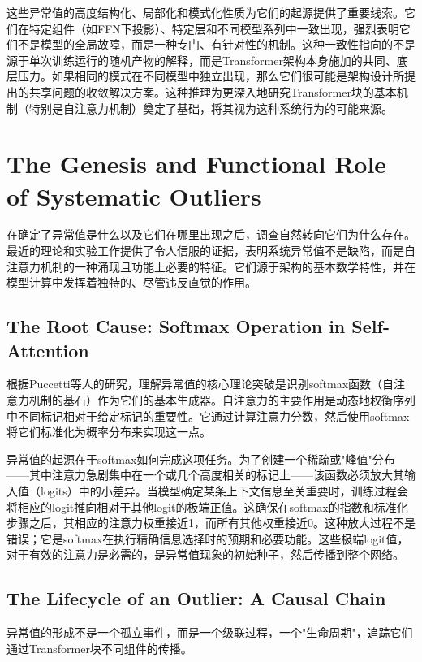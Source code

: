 \documentclass{article}
\begin{document}
这些异常值的高度结构化、局部化和模式化性质为它们的起源提供了重要线索。它们在特定组件（如FFN下投影）、特定层和不同模型系列中一致出现，强烈表明它们不是模型的全局故障，而是一种专门、有针对性的机制。这种一致性指向的不是源于单次训练运行的随机产物的解释，而是Transformer架构本身施加的共同、底层压力。如果相同的模式在不同模型中独立出现，那么它们很可能是架构设计所提出的共享问题的收敛解决方案。这种推理为更深入地研究Transformer块的基本机制（特别是自注意力机制）奠定了基础，将其视为这种系统行为的可能来源。

\section{The Genesis and Functional Role of Systematic Outliers}

在确定了异常值是什么以及它们在哪里出现之后，调查自然转向它们为什么存在。最近的理论和实验工作提供了令人信服的证据，表明系统异常值不是缺陷，而是自注意力机制的一种涌现且功能上必要的特征。它们源于架构的基本数学特性，并在模型计算中发挥着独特的、尽管违反直觉的作用。

\subsection{The Root Cause: Softmax Operation in Self-Attention}

根据Puccetti等人\cite{pucetti2021}的研究，理解异常值的核心理论突破是识别softmax函数（自注意力机制的基石）作为它们的基本生成器。自注意力的主要作用是动态地权衡序列中不同标记相对于给定标记的重要性。它通过计算注意力分数，然后使用softmax将它们标准化为概率分布来实现这一点。

异常值的起源在于softmax如何完成这项任务。为了创建一个稀疏或"峰值"分布——其中注意力急剧集中在一个或几个高度相关的标记上——该函数必须放大其输入值（logits）中的小差异。当模型确定某条上下文信息至关重要时，训练过程会将相应的logit推向相对于其他logit的极端正值。这确保在softmax的指数和标准化步骤之后，其相应的注意力权重接近1，而所有其他权重接近0。这种放大过程不是错误；它是softmax在执行精确信息选择时的预期和必要功能。这些极端logit值，对于有效的注意力是必需的，是异常值现象的初始种子，然后传播到整个网络。

\subsection{The Lifecycle of an Outlier: A Causal Chain}

异常值的形成不是一个孤立事件，而是一个级联过程，一个"生命周期"，追踪它们通过Transformer块不同组件的传播。
\end{document}
